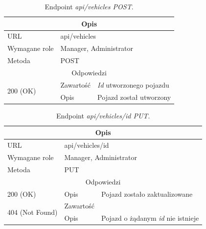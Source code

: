 \documentclass[eng,printmode,openany]{mgr}
\begin{document}
	\begin{table}[H]
		\caption{Endpoint \textit{api/vehicles POST}.}
		\begin{tabularx}{\textwidth}{|l|l|X|}
			\hline
			\multicolumn{3}{|c|}{Opis}
			\\ \hline
			URL                       & \multicolumn{2}{l|}{api/vehicles}
			\\ \hline
			Wymagane role             & \multicolumn{2}{l|}{Manager, Administrator}
			\\ \hline
			Metoda                    & \multicolumn{2}{l|}{POST}
			\\ \hline
			\multicolumn{3}{|c|}{Odpowiedzi}
			\\ \hline
			\multirow{2}{*}{200 (OK)} 		& Zawartość     & \textit{Id} utworzonego pojazdu
			\\ \cline{2-3}                  & Opis         	& Pojazd został utworzony
			\\ \hline
		\end{tabularx}
	\end{table}
	
	\begin{table}[H]
		\caption{Endpoint \textit{api/vehicles/id PUT}.}
		\begin{tabularx}{\textwidth}{|l|l|X|}
			\hline
			\multicolumn{3}{|c|}{Opis}
			\\ \hline
			URL                       & \multicolumn{2}{l|}{api/vehicles/id}
			\\ \hline
			Wymagane role             & \multicolumn{2}{l|}{Manager, Administrator}
			\\ \hline
			Metoda                    & \multicolumn{2}{l|}{PUT}
			\\ \hline
			\multicolumn{3}{|c|}{Odpowiedzi}
			\\ \hline
			200 (OK) 		                        & Opis      	& Pojazd zostało zaktualizowane
			\\ \hline
			\multirow{2}{*}{404 (Not Found)} 	    & Zawartość     &   
			\\ \cline{2-3}                          & Opis          & Pojazd o żądanym \textit{id} nie istnieje
			\\ \hline
		\end{tabularx}
	\end{table}
	
\end{document}
